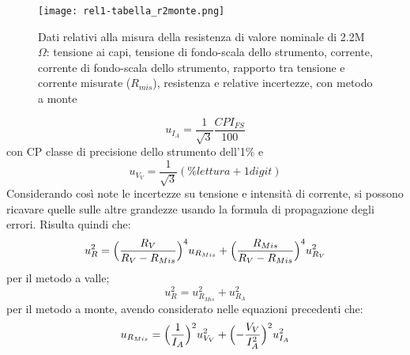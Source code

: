 \documentclass{article}
\begin{document}
\begin{figure}
    \centering
    \texttt{[image: rel1-tabella\_r2monte.png]}
    \caption{Dati relativi alla misura della resistenza di valore nominale di 2.2M$\Omega$:
tensione ai capi, tensione di fondo-scala dello strumento, corrente, corrente di
fondo-scala dello strumento, rapporto tra tensione e corrente misurate ($R_{mis}$),
resistenza e relative incertezze, con metodo a monte}
    \label{figura2}
\end{figure}
\begin{equation}
    u_{I_A} = \frac{1}{\sqrt{3}}\frac{CP I_{FS}}{100}
\end{equation}
con CP classe di precisione dello strumento dell’1$\%$ e
\begin{equation}
    u_{V_V} = \frac{1}{\sqrt{3}}(\%lettura + 1digit)
\end{equation}
Considerando così note le incertezze su tensione e intensità di corrente, si possono ricavare quelle sulle altre grandezze usando la formula di propagazione degli errori. Risulta quindi che:
\begin{equation}
    u_R^2 = \Bigl (\frac{R_V}{R_V-R_{Mis}}\Bigl )^4 u_{R_{Mis}} + \Bigl (\frac{R_{Mis}}{R_V-R_{Mis}}\Bigl )^4 u_{R_V}^2
\end{equation}
per il metodo a valle;
\begin{equation}
    u_R^2 = u_{R_{Mis}}^2 + u_{R_A}^2
\end{equation}
per il metodo a monte, avendo considerato nelle equazioni precedenti che:
\begin{equation}
    u_{R_{Mis}} = \Bigl (\frac{1}{I_A} \Bigl )^2 u_{V_V}^2 + \Bigl (-\frac{V_V}{I_A^2} \Bigl )^2 u_{I_A}^2
\end{equation}
\end{document}
